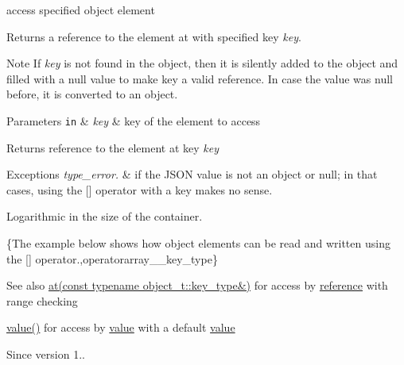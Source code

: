 access specified object element 

Returns a reference to the element at with specified key {\itshape key}.

\begin{DoxyNote}{Note}
If {\itshape key} is not found in the object, then it is silently added to the object and filled with a {\ttfamily null} value to make {\ttfamily key} a valid reference. In case the value was {\ttfamily null} before, it is converted to an object.
\end{DoxyNote}

\begin{DoxyParams}[1]{Parameters}
\mbox{\tt in}  & {\em key} & key of the element to access\\
\hline
\end{DoxyParams}
\begin{DoxyReturn}{Returns}
reference to the element at key {\itshape key} 
\end{DoxyReturn}

\begin{DoxyExceptions}{Exceptions}
{\em type\+\_\+error.} & if the J\+S\+ON value is not an object or null; in that cases, using the \mbox{[}\mbox{]} operator with a key makes no sense.\\
\hline
\end{DoxyExceptions}
Logarithmic in the size of the container.

\{The example below shows how object elements can be read and written using the {\ttfamily \mbox{[}\mbox{]}} operator.,operatorarray\+\_\+\+\_\+key\+\_\+type\}

\begin{DoxySeeAlso}{See also}
\hyperlink{classnlohmann_1_1basic__json_a93403e803947b86f4da2d1fb3345cf2c}{at(const typename object\+\_\+t\+::key\+\_\+type\&)} for access by \hyperlink{classnlohmann_1_1basic__json_ac6a5eddd156c776ac75ff54cfe54a5bc}{reference} with range checking 

\hyperlink{classnlohmann_1_1basic__json_a404017aa52714a0a4bc79d5af7e4ad2b}{value()} for access by \hyperlink{classnlohmann_1_1basic__json_a404017aa52714a0a4bc79d5af7e4ad2b}{value} with a default \hyperlink{classnlohmann_1_1basic__json_a404017aa52714a0a4bc79d5af7e4ad2b}{value}
\end{DoxySeeAlso}
\begin{DoxySince}{Since}
version 1.. 
\end{DoxySince}
